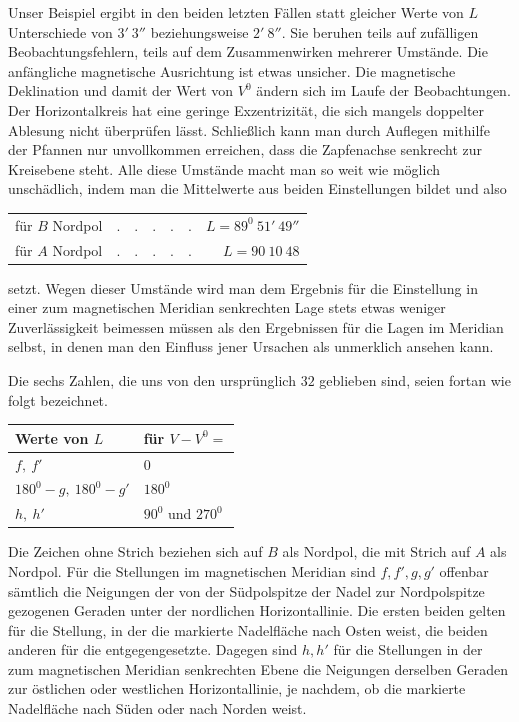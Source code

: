 Unser Beispiel ergibt in den beiden letzten Fällen statt gleicher Werte von $L$ Unterschiede von $3'\ 3''$ beziehungsweise $2'\ 8''$. Sie beruhen teils auf zufälligen Beobachtungsfehlern, teils auf dem Zusammenwirken mehrerer Umstände. Die anfängliche magnetische Ausrichtung ist etwas unsicher. Die magnetische Deklination und damit der Wert von $V^0$ ändern sich im Laufe der Beobachtungen. Der Horizontalkreis hat eine geringe Exzentrizität, die sich mangels doppelter Ablesung nicht überprüfen lässt. Schließlich kann man durch Auflegen mithilfe der Pfannen nur unvollkommen erreichen, dass die Zapfenachse senkrecht zur Kreisebene steht. Alle diese Umstände macht man so weit wie möglich unschädlich, indem man die Mittelwerte aus beiden Einstellungen bildet und also


\begin{center}
\begin{tabular}{llr}
für $B$ Nordpol&$.\quad.\quad.\quad.\quad.$&$L=89^0\ 51'\ 49''$\\
für $A$ Nordpol&$.\quad.\quad.\quad.\quad.$&$L=90\ 10\ 48$
\end{tabular}
\end{center}
setzt. Wegen dieser Umstände wird man dem Ergebnis für die Einstellung in einer zum magnetischen Meridian senkrechten Lage stets etwas weniger Zuverlässigkeit beimessen müssen als den Ergebnissen für die Lagen im Meridian selbst, in denen man den Einfluss jener Ursachen als unmerklich ansehen kann.

Die sechs Zahlen, die uns von den ursprünglich $32$ geblieben sind, seien fortan wie folgt bezeichnet.
\begin{center}
\begin{tabular}{l|l}
Werte von $L$&für $V-V^0=$\\\hline
$f,\ f'$&$0$\\
$180^0-g,\ 180^0-g'$&$180^0$\\
$h,\ h'$&$90^0$ und $270^0$
\end{tabular}
\end{center}
Die Zeichen ohne Strich beziehen sich auf $B$ als Nordpol, die mit Strich auf $A$ als Nordpol. Für die Stellungen im magnetischen Meridian sind $f,f',g,g'$ offenbar sämtlich die Neigungen der von der Südpolspitze der Nadel zur Nordpolspitze gezogenen Geraden unter der nordlichen Horizontallinie. Die ersten beiden gelten für die Stellung, in der die markierte Nadelfläche nach Osten weist, die beiden anderen für die entgegengesetzte. Dagegen sind $h,h'$ für die Stellungen in der zum magnetischen Meridian senkrechten Ebene die Neigungen derselben Geraden zur östlichen oder westlichen Horizontallinie, je nachdem, ob die markierte Nadelfläche nach Süden oder nach Norden weist.

